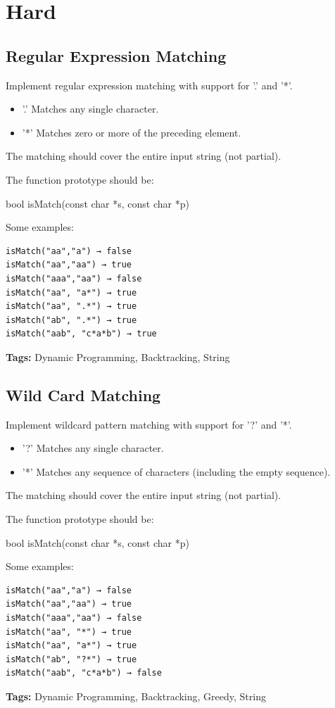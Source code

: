 \documentclass[12pt]{book}
\begin{document}
\section{Hard}
\label{sec-16-2}
\subsection{Regular Expression Matching}
\label{sec-16-2-1}
Implement regular expression matching with support for '.' and '*'.
\begin{itemize}
\item '.' Matches any single character.
\item '*' Matches zero or more of the preceding element.
\end{itemize}

The matching should cover the entire input string (not partial).

The function prototype should be:

bool isMatch(const char *s, const char *p)

Some examples:
\lstset{language=java,label= ,caption= ,numbers=none}
\begin{lstlisting}
isMatch("aa","a") → false
isMatch("aa","aa") → true
isMatch("aaa","aa") → false
isMatch("aa", "a*") → true
isMatch("aa", ".*") → true
isMatch("ab", ".*") → true
isMatch("aab", "c*a*b") → true
\end{lstlisting}
\textbf{Tags:} Dynamic Programming, Backtracking, String
\subsection{Wild Card Matching}
\label{sec-16-2-2}
Implement wildcard pattern matching with support for '?' and '*'.
\begin{itemize}
\item '?' Matches any single character.
\item '*' Matches any sequence of characters (including the empty sequence).
\end{itemize}

The matching should cover the entire input string (not partial).

The function prototype should be:

bool isMatch(const char *s, const char *p)

Some examples:
\lstset{language=java,label= ,caption= ,numbers=none}
\begin{lstlisting}
isMatch("aa","a") → false
isMatch("aa","aa") → true
isMatch("aaa","aa") → false
isMatch("aa", "*") → true
isMatch("aa", "a*") → true
isMatch("ab", "?*") → true
isMatch("aab", "c*a*b") → false
\end{lstlisting}
\textbf{Tags:} Dynamic Programming, Backtracking, Greedy, String
\end{document}
